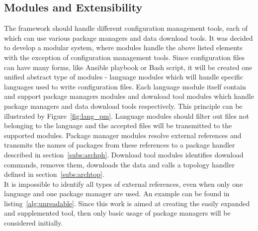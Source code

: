 \subsection{Modules and Extensibility}
The framework should handle different configuration management tools, each of which can use various package managers and data download tools.
It was decided to develop a modular system, where modules handle the above listed elements with the exception of configuration management tools.
Since configuration files can have many forms, like Ansible playbook or Bash script, it will be created one unified abstract type of modules - language modules which will handle specific languages used to write configuration files.
Each language module itself contain and support package managers modules and download tool modules which handle package managers and data download tools respectively.
This principle can be illustrated by Figure~\ref{fig:lang_pm}.
Language modules should filter out files not belonging to the language and the accepted files will be transmitted to the supported modules.
Package manager modules resolve external references and transmits the names of packages from these references to a package handler described in section~\ref{subs:archph}.
Download tool modules identifies download commands, removes them, downloads the data and calls a topology handler defined in section~\ref{subs:archtop}. 
\\
It is impossible to identify all types of external references, even when only one language and one package manager are used.
An example can be found in listing~\ref{alg:unreadable}.
Since this work is aimed at creating the easily expanded and supplemented tool, then only basic usage of package managers will be considered initially.\\
